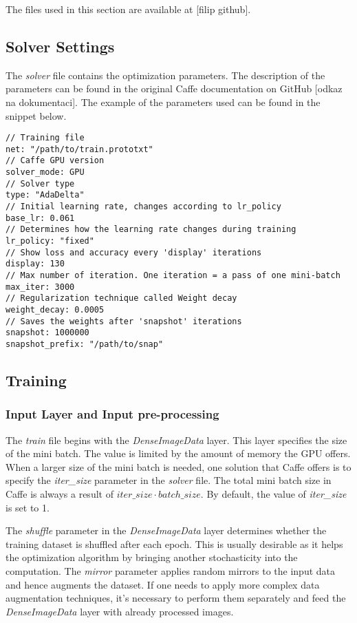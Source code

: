 The files used in this section are available at [filip github].

\subsection{Solver Settings}

The \textit{solver} file contains the optimization parameters. The description of the parameters can be found in the original Caffe documentation on GitHub [odkaz na dokumentaci]. The example of the parameters used can be found in the snippet below. 

\begin{lstlisting}
// Training file
net: "/path/to/train.prototxt"	
// Caffe GPU version
solver_mode: GPU
// Solver type		
type: "AdaDelta"
// Initial learning rate, changes according to lr_policy		
base_lr: 0.061		
// Determines how the learning rate changes during training
lr_policy: "fixed"	
// Show loss and accuracy every 'display' iterations
display: 130
// Max number of iteration. One iteration = a pass of one mini-batch			
max_iter: 3000	
// Regularization technique called Weight decay		
weight_decay: 0.0005
// Saves the weights after 'snapshot' iterations
snapshot: 1000000		
snapshot_prefix: "/path/to/snap" 
\end{lstlisting}

\subsection{Training}

\subsubsection{Input Layer and Input pre-processing}

The \textit{train} file begins with the \textit{DenseImageData} layer. This layer specifies the size of the mini batch. The value is limited by the amount of memory the GPU offers. When a larger size of the mini batch is needed, one solution that Caffe offers is to specify the \textit{iter\_size} parameter in the \textit{solver} file. The total mini batch size in Caffe is always a result of $iter\_size \cdot batch\_size$. By default, the value of \textit{iter\_size} is set to 1.

The \textit{shuffle} parameter in the \textit{DenseImageData} layer determines whether the training dataset is shuffled after each epoch. This is usually desirable as it helps the optimization algorithm by bringing another stochasticity into the computation. The \textit{mirror} parameter applies random mirrors to the input data and hence augments the dataset. If one needs to apply more complex data augmentation techniques, it's necessary to perform them separately and feed the \textit{DenseImageData} layer with already processed images.

